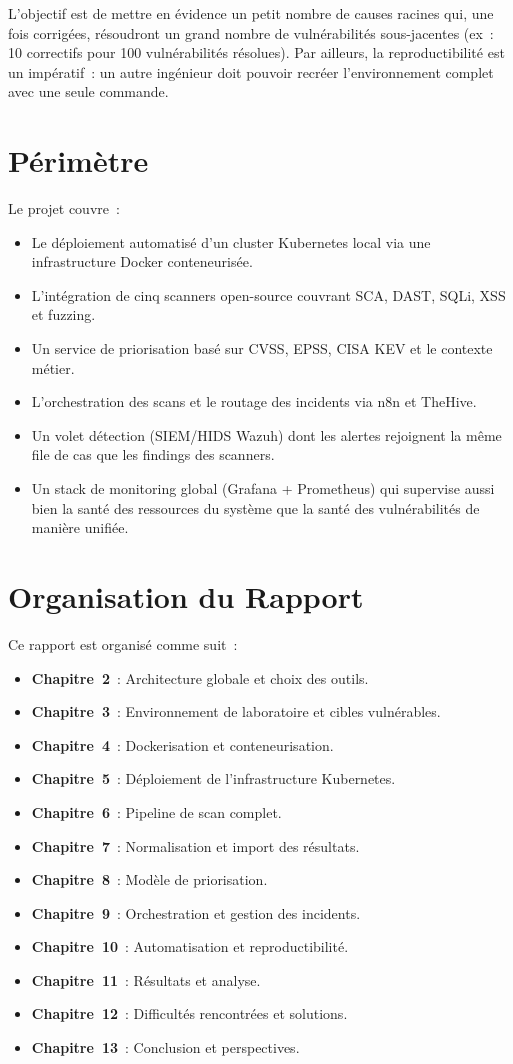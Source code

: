 \documentclass[12pt,a4paper]{report}
\begin{document}
L'objectif est de mettre en évidence un petit nombre de causes racines qui, une fois corrigées, résoudront un grand nombre de vulnérabilités sous-jacentes (ex~: 10 correctifs pour 100 vulnérabilités résolues). Par ailleurs, la reproductibilité est un impératif~: un autre ingénieur doit pouvoir recréer l'environnement complet avec une seule commande.

\section{Périmètre}
Le projet couvre~:
\begin{itemize}[nosep]
    \item Le déploiement automatisé d'un cluster Kubernetes local via une infrastructure Docker conteneurisée.
    \item L'intégration de cinq scanners open-source couvrant SCA, DAST, SQLi, XSS et fuzzing.
    \item Un service de priorisation basé sur CVSS, EPSS, CISA KEV et le contexte métier.
    \item L'orchestration des scans et le routage des incidents via n8n et TheHive.
    \item Un volet détection (SIEM/HIDS Wazuh) dont les alertes rejoignent la même file de cas que les findings des scanners.
    \item Un stack de monitoring global (Grafana + Prometheus) qui supervise aussi bien la santé des ressources du système que la santé des vulnérabilités de manière unifiée.
\end{itemize}

\section{Organisation du Rapport}
Ce rapport est organisé comme suit~:
\begin{itemize}[nosep]
    \item \textbf{Chapitre~2}~: Architecture globale et choix des outils.
    \item \textbf{Chapitre~3}~: Environnement de laboratoire et cibles vulnérables.
    \item \textbf{Chapitre~4}~: Dockerisation et conteneurisation.
    \item \textbf{Chapitre~5}~: Déploiement de l'infrastructure Kubernetes.
    \item \textbf{Chapitre~6}~: Pipeline de scan complet.
    \item \textbf{Chapitre~7}~: Normalisation et import des résultats.
    \item \textbf{Chapitre~8}~: Modèle de priorisation.
    \item \textbf{Chapitre~9}~: Orchestration et gestion des incidents.
    \item \textbf{Chapitre~10}~: Automatisation et reproductibilité.
    \item \textbf{Chapitre~11}~: Résultats et analyse.
    \item \textbf{Chapitre~12}~: Difficultés rencontrées et solutions.
    \item \textbf{Chapitre~13}~: Conclusion et perspectives.
\end{itemize}
\end{document}

